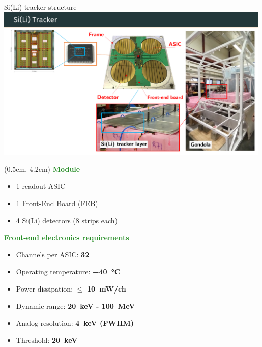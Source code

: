 \documentclass[aspectratio=169,xcolor=dvipsnames]{beamer} %
\begin{document}
\begin{frame}{Si(Li) tracker structure}
    \fontsize{9pt}{1}\selectfont
    \addtolength{\leftmargini}{\labelsep}
    \vspace{0.1cm}
    \includegraphics[width=0.99\textwidth]{images/experiment_intro/manghisoni_SIE_ASSEMBLY.pdf}
    \begin{textblock*}{0.35\textwidth}(0.5cm, 4.2cm)
        \textbf{\textcolor{ForestGreen}{Module}}
        \fontsize{8.5pt}{1}\selectfont
        \vspace{0.05cm}
        \begin{itemize}
            \item 1 readout ASIC
            \item 1 Front-End Board (FEB)
            \item 4 Si(Li) detectors (8 strips each)
        \end{itemize}
        \vspace{0.1cm}
        \fontsize{9pt}{1}\selectfont
        \textbf{\textcolor{ForestGreen}{Front-end electronics requirements}}
        \fontsize{8.5pt}{1}\selectfont
        \vspace{0.05cm}
        \begin{itemize}
            \item Channels per ASIC: \textbf{32}
            \item Operating temperature: \textbf{\SI{-40}{\celsius}}
            \item Power dissipation: $\leq$ \textbf{\SI{10}{\milli\watt/ch}}
            \item Dynamic range: \textbf{\SI{20}{\kilo\electronvolt} - \SI{100}{\mega\electronvolt}}
            \item Analog resolution: \textbf{\SI{4}{\kilo\electronvolt} (FWHM)}
            \item Threshold: \textbf{\SI{20}{\kilo\electronvolt}}
        \end{itemize}
    \end{textblock*}
\end{frame}
\end{document}
